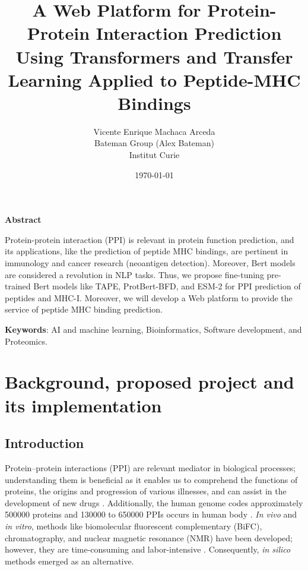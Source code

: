 \documentclass[a4paper,11pt]{article}
\title{ A Web Platform for Protein-Protein Interaction Prediction Using Transformers and Transfer Learning Applied to Peptide-MHC Bindings }
\author{Vicente Enrique Machaca Arceda \\ Bateman Group (Alex Bateman) \\ Institut Curie}
\date{\today}
\begin{document}
	
\maketitle
	
\begin{center}
	\begin{large}
		\textbf{Abstract}
	\end{large} 
\end{center}

	\vspace{0.1cm}
	
	Protein-protein interaction (PPI) is relevant in protein function prediction, and its applications, like the prediction of peptide MHC bindings, are pertinent in immunology and cancer research (neoantigen detection). Moreover, Bert models are considered a revolution in NLP tasks. Thus, we propose fine-tuning pre-trained Bert models like  TAPE, ProtBert-BFD, and ESM-2 for PPI prediction of peptides and MHC-I. Moreover, we will develop a Web platform to provide the service of peptide MHC binding prediction.
	


	
\textbf{Keywords}: 	AI and machine learning, Bioinformatics, Software development, and Proteomics.
	


\section{Background, proposed project and its implementation}

\subsection{Introduction}

Protein–protein interactions (PPI) are relevant mediator in biological processes; understanding  them is beneficial as it enables us to comprehend the functions of proteins, the origins and progression of various illnesses, and can assist in the development of new drugs  \cite{hu2022deep,jha2023prediction}. Additionally, the human genome codes approximately 500000 proteins and 130000 to 650000 PPIs occurs in human body \cite{hu2022deep}. \textit{In vivo} and \textit{in vitro}, methods like biomolecular fluorescent complementary (BiFC), chromatography, and nuclear magnetic resonance (NMR) have been developed; however, they are time-consuming and labor-intensive \cite{rao2014protein,hu2022deep}. Consequently, \textit{in silico} methods  emerged as an alternative.\\
\end{document}
